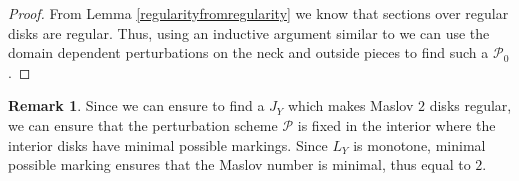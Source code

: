 \documentclass[11pt, oneside,dvipsnames]{amsart}
\newcommand{\<}{\langle}
\renewcommand{\>}{\rangle}
\newcommand{\cP}{\mathcal{P}}
\theoremstyle{definition}
\theoremstyle{definition}
\newtheorem{remark}[Theorem]{Remark}
\numberwithin{equation}{subsection}
\begin{document}
\begin{proof}
    From Lemma \ref{regularityfromregularity} we know that sections over regular disks are regular. Thus, using an inductive argument similar to \cite{cwstab,floflip} we can use the domain dependent perturbations on the neck and outside pieces to find such a $\cP_0$.
\end{proof}


\begin{remark}
    Since we can ensure to find a $J_Y$ which makes Maslov $2$ disks regular, we can ensure that the perturbation scheme $\cP$ is fixed in the interior where the interior disks have minimal possible markings. Since $L_Y$ is monotone, minimal possible marking ensures that  the Maslov number is minimal, thus equal to $2$.
\end{remark}
\end{document}
